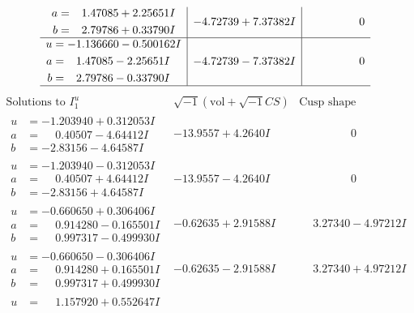 \documentclass[1p]{elsarticle_modified}
\theoremstyle{definition}
\newcommand{\I}{\sqrt{-1}}
\begin{document}
$$\begin{array}{c|c|c}
\begin{aligned}
a &= \phantom{-}1.47085 + 2.25651 I \\
b &= \phantom{-}2.79786 + 0.33790 I\end{aligned}
 & -4.72739 + 7.37382 I & \phantom{-0.000000 } 0 \\ \hline\begin{aligned}
u &= -1.136660 - 0.500162 I \\
a &= \phantom{-}1.47085 - 2.25651 I \\
b &= \phantom{-}2.79786 - 0.33790 I\end{aligned}
 & -4.72739 - 7.37382 I & \phantom{-0.000000 } 0\\
 \hline 
 \end{array}$$\newpage$$\begin{array}{c|c|c}  
\text{Solutions to }I^u_{1}& \I (\text{vol} + \sqrt{-1}CS) & \text{Cusp shape}\\
 \hline 
\begin{aligned}
u &= -1.203940 + 0.312053 I \\
a &= \phantom{-}0.40507 - 4.64412 I \\
b &= -2.83156 - 4.64587 I\end{aligned}
 & -13.9557 + 4.2640 I & \phantom{-0.000000 } 0 \\ \hline\begin{aligned}
u &= -1.203940 - 0.312053 I \\
a &= \phantom{-}0.40507 + 4.64412 I \\
b &= -2.83156 + 4.64587 I\end{aligned}
 & -13.9557 - 4.2640 I & \phantom{-0.000000 } 0 \\ \hline\begin{aligned}
u &= -0.660650 + 0.306406 I \\
a &= \phantom{-}0.914280 - 0.165501 I \\
b &= \phantom{-}0.997317 - 0.499930 I\end{aligned}
 & -0.62635 + 2.91588 I & \phantom{-}3.27340 - 4.97212 I \\ \hline\begin{aligned}
u &= -0.660650 - 0.306406 I \\
a &= \phantom{-}0.914280 + 0.165501 I \\
b &= \phantom{-}0.997317 + 0.499930 I\end{aligned}
 & -0.62635 - 2.91588 I & \phantom{-}3.27340 + 4.97212 I \\ \hline\begin{aligned}
u &= \phantom{-}1.157920 + 0.552647 I \\

\end{aligned}
\end{array}$$
\end{document}
